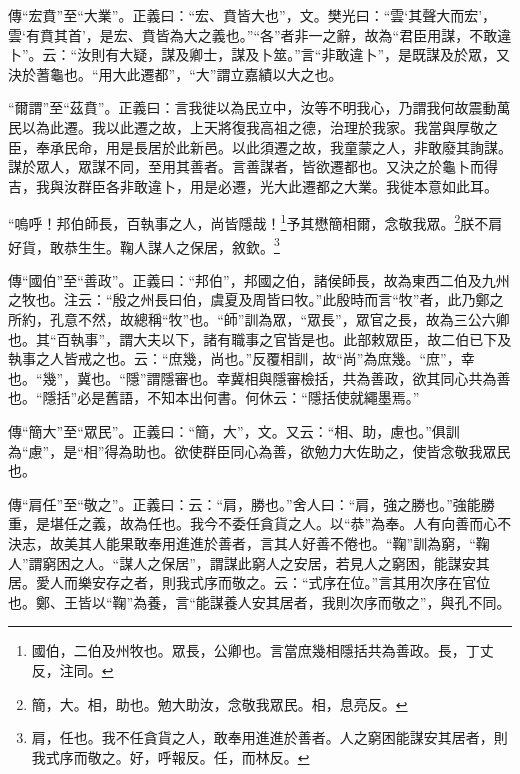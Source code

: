{\noindent\zhuan{}\fzbyks 傳“宏賁”至“大業”。正義曰：“宏、賁皆大也”，文。樊光曰：“雲‘其聲大而宏’，雲‘有賁其首’，是宏、賁皆為大之義也。”“各”者非一之辭，故為“君臣用謀，不敢違卜”。云：“汝則有大疑，謀及卿士，謀及卜筮。”言“非敢違卜”，是既謀及於眾，又決於蓍龜也。“用大此遷都”，“大”謂立嘉績以大之也。 \par}

{\noindent\shu{}\fzkt “爾謂”至“茲賁”。正義曰：言我徙以為民立中，汝等不明我心，乃謂我何故震動萬民以為此遷。我以此遷之故，上天將復我高祖之德，治理於我家。我當與厚敬之臣，奉承民命，用是長居於此新邑。以此須遷之故，我童蒙之人，非敢廢其詢謀。謀於眾人，眾謀不同，至用其善者。言善謀者，皆欲遷都也。又決之於龜卜而得吉，我與汝群臣各非敢違卜，用是必遷，光大此遷都之大業。我徙本意如此耳。 \par}

“嗚呼！邦伯師長，百執事之人，尚皆隱哉！\footnote{國伯，二伯及州牧也。眾長，公卿也。言當庶幾相隱括共為善政。長，丁丈反，注同。}予其懋簡相爾，念敬我眾。\footnote{簡，大。相，助也。勉大助汝，念敬我眾民。相，息亮反。}朕不肩好貨，敢恭生生。鞠人謀人之保居，敘欽。\footnote{肩，任也。我不任貪貨之人，敢奉用進進於善者。人之窮困能謀安其居者，則我式序而敬之。好，呼報反。任，而林反。}

{\noindent\zhuan{}\fzbyks 傳“國伯”至“善政”。正義曰：“邦伯”，邦國之伯，諸侯師長，故為東西二伯及九州之牧也。注云：“殷之州長曰伯，虞夏及周皆曰牧。”此殷時而言“牧”者，此乃鄭之所約，孔意不然，故總稱“牧”也。“師”訓為眾，“眾長”，眾官之長，故為三公六卿也。其“百執事”，謂大夫以下，諸有職事之官皆是也。此部敕眾臣，故二伯已下及執事之人皆戒之也。云：“庶幾，尚也。”反覆相訓，故“尚”為庶幾。“庶”，幸也。“幾”，冀也。“隱”謂隱審也。幸冀相與隱審檢括，共為善政，欲其同心共為善也。“隱括”必是舊語，不知本出何書。何休云：“隱括使就繩墨焉。” \par}

{\noindent\zhuan{}\fzbyks 傳“簡大”至“眾民”。正義曰：“簡，大”，文。又云：“相、助，慮也。”俱訓為“慮”，是“相”得為助也。欲使群臣同心為善，欲勉力大佐助之，使皆念敬我眾民也。 \par}

{\noindent\zhuan{}\fzbyks 傳“肩任”至“敬之”。正義曰：云：“肩，勝也。”舍人曰：“肩，強之勝也。”強能勝重，是堪任之義，故為任也。我今不委任貪貨之人。以“恭”為奉。人有向善而心不決志，故美其人能果敢奉用進進於善者，言其人好善不倦也。“鞠”訓為窮，“鞠人”謂窮困之人。“謀人之保居”，謂謀此窮人之安居，若見人之窮困，能謀安其居。愛人而樂安存之者，則我式序而敬之。云：“式序在位。”言其用次序在官位也。鄭、王皆以“鞠”為養，言“能謀養人安其居者，我則次序而敬之”，與孔不同。 \par}

